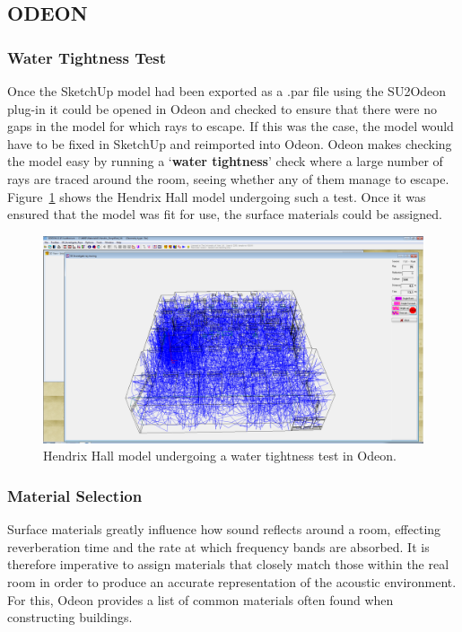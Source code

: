 \documentclass[../../main.tex]{subfiles}
\begin{document}
\subsection{ODEON}
	\label{odeon}
	\subsubsection{Water Tightness Test}
		Once the SketchUp model had been exported as a .par file using the SU2Odeon plug-in \cite{SU2Odeon} it could be opened in Odeon and checked to ensure that there were no gaps in the model for which rays to escape. If this was the case, the model would have to be fixed in SketchUp and reimported into Odeon. Odeon makes checking the model easy by running a `\textbf{water tightness}' check where a large number of rays are traced around the room, seeing whether any of them manage to escape. Figure~\ref{watertight} shows the Hendrix Hall model undergoing such a test. Once it was ensured that the model was fit for use, the surface materials could be assigned.

		\begin{figure}[H]
			\centerline{\includegraphics[scale = 0.3]{Sections/Implementation/Odeon/images/OdeonRays/waterTight2.PNG}}
			\caption{Hendrix Hall model undergoing a water tightness test in Odeon.}
			\label{watertight}
		\end{figure}

	\subsubsection{Material Selection}
	\label{odeon:materials}
		Surface materials greatly influence how sound reflects around a room, effecting reverberation time and the rate at which frequency bands are absorbed. It is therefore imperative to assign materials that closely match those within the real room in order to produce an accurate representation of the acoustic environment. For this, Odeon provides a list of common materials often found when constructing buildings.
\end{document}
